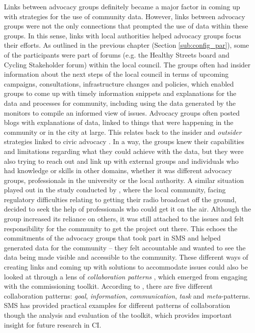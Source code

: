 Links between advocacy groups definitely became a major factor in coming up with strategies for the use of community data. However, links between advocacy groups were not the only connections that prompted the use of data within these groups. In this sense, links with local authorities helped advocacy groups focus their efforts. As outlined in the previous chapter (Section \ref{sub:config_par}), some of the participants were part of forums (e.g. the Healthy Streets board and Cycling Stakeholder forum) within the local council. The groups often had insider information about the next steps of the local council in terms of upcoming campaigns, consultations, infrastructure changes and policies, which enabled groups to come up with timely information snippets and explanations for the data and processes for community, including using the data generated by the monitors to compile an informed view of issues. Advocacy groups often posted blogs with explanations of data, linked to things that were happening in the community or in the city at large. This relates back to the \textup{insider} and \textit{outsider} strategies linked to civic advocacy \citep{asad_tap_2017}. In a way, the groups knew their capabilities and limitations regarding what they could achieve with the data, but they were also trying to reach out and link up with external groups and individuals who had knowledge or skills in other domains, whether it was different advocacy groups, professionals in the university or the local authority. A similar situation played out in the study conducted by \citet{disalvo_towards_2009}, where the local community, facing regulatory difficulties relating to getting their radio broadcast off the ground, decided to seek the help of professionals who could get it on the air. Although the group increased its reliance on others, it was still attached to the issues and felt responsibility for the community to get the project out there. This echoes the commitments of the advocacy groups that took part in SMS and helped generated data for the community -- they felt accountable and wanted to see the data being made visible and accessible to the community. These different ways of creating links and coming up with solutions to accommodate issues could also be looked at through a lens of \textit{collaboration patterns} \citep{moor_collaboration_2009}, which emerged from engaging with the commissioning toolkit. According to \citet{moor_collaboration_2009}, there are five different collaboration patterns: \textit{goal}, \textit{information}, \textit{communication}, \textit{task} and \textit{meta}-patterns. SMS has provided practical examples for different patterns of collaboration though the analysis and evaluation of the toolkit, which provides important insight for future research in CI.

